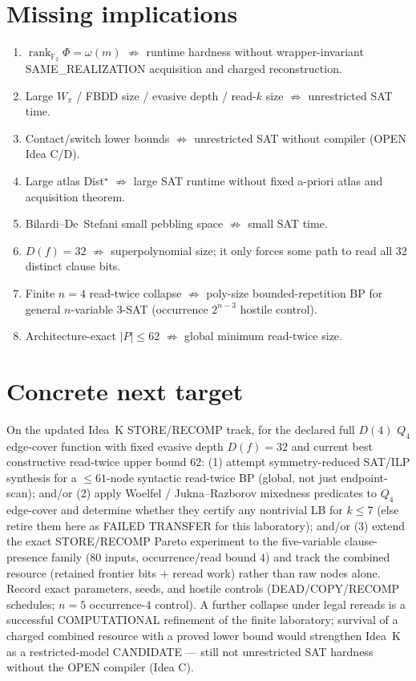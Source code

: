 \documentclass[11pt]{article}
\begin{document}
\section*{Missing implications}
\begin{enumerate}
\item $\operatorname{rank}_{\mathbb F_2}\Phi=\omega(m)$ $\not\Rightarrow$ runtime hardness without
  wrapper-invariant SAME\_REALIZATION acquisition and charged reconstruction.
\item Large $W_\pi$ / FBDD size / evasive depth / read-$k$ size $\not\Rightarrow$ unrestricted SAT time.
\item Contact/switch lower bounds $\not\Rightarrow$ unrestricted SAT without compiler (OPEN Idea C/D).
\item Large atlas Dist$^\star$ $\not\Rightarrow$ large SAT runtime without fixed a-priori atlas
  and acquisition theorem.
\item Bilardi--De~Stefani small pebbling space $\not\Rightarrow$ small SAT time.
\item $D(f)=32$ $\not\Rightarrow$ superpolynomial size; it only forces some path to read all
  $32$ distinct clause bits.
\item Finite $n=4$ read-twice collapse $\not\Rightarrow$ poly-size bounded-repetition BP for general
  $n$-variable 3-SAT (occurrence $2^{n-3}$ hostile control).
\item Architecture-exact $|P|\le62$ $\not\Rightarrow$ global minimum read-twice size.
\end{enumerate}

\section*{Concrete next target}
On the updated Idea~K STORE/RECOMP track, for the declared full $D(4)$ $Q_4$ edge-cover function
with fixed evasive depth $D(f)=32$ and current best constructive read-twice upper bound $62$:
(1) attempt symmetry-reduced SAT/ILP synthesis for a $\le61$-node syntactic read-twice BP
(global, not just endpoint-scan); and/or
(2) apply Woelfel / Jukna--Razborov mixedness predicates to $Q_4$ edge-cover and determine
whether they certify any nontrivial LB for $k\le7$ (else retire them here as FAILED TRANSFER
for this laboratory); and/or
(3) extend the exact STORE/RECOMP Pareto experiment to the five-variable clause-presence family
($80$ inputs, occurrence/read bound $4$) and track the combined resource
(retained frontier bits $+$ reread work) rather than raw nodes alone.
Record exact parameters, seeds, and hostile controls (DEAD/COPY/RECOMP schedules;
$n=5$ occurrence-$4$ control). A further collapse under legal rereads is a successful
COMPUTATIONAL refinement of the finite laboratory; survival of a charged combined resource
with a proved lower bound would strengthen Idea~K as a restricted-model CANDIDATE ---
still not unrestricted SAT hardness without the OPEN compiler (Idea C).

\end{document}
